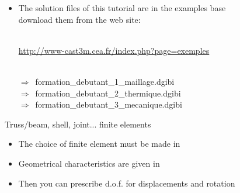 \label{complements}

\begin{frame}{}
  \begin{itemize}
    \item {}
             {The solution files of this tutorial are in the examples base\\
              download them from the web site:}\\~\\
    \begin{center}
      \url{http://www-cast3m.cea.fr/index.php?page=exemples}\\~\\
    \end{center}
    $\Rightarrow$~formation\_debutant\_1\_maillage.dgibi\\
    $\Rightarrow$~formation\_debutant\_2\_thermique.dgibi\\
    $\Rightarrow$~formation\_debutant\_3\_mecanique.dgibi
  \end{itemize}
\end{frame}

\begin{frame}{
                 {Truss/beam, shell, joint... finite elements}}
  \begin{itemize}
    \item {}
             {The choice of finite element must be made in }
    
    \item {}
             {Geometrical characteristics are given in }
    
    \item {}
             {Then you can prescribe d.o.f. for displacements and rotation}
    
  \end{itemize}
\end{frame}

